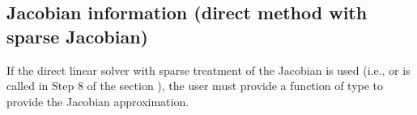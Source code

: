 \documentclass[letterpaper,10pt,english]{sphinxmanual}
\begin{document}
\subsection{Jacobian information (direct method with sparse Jacobian)}
\label{c_interface/User_supplied:cinterface-sparsejacobianfn}\label{c_interface/User_supplied:jacobian-information-direct-method-with-sparse-jacobian}
If the direct linear solver with sparse treatment of the Jacobian is
used (i.e., {\hyperref[c_interface/User_callable:c.ARKKLU]{\emph{}}} or {\hyperref[c_interface/User_callable:c.ARKSuperLUMT]{\emph{}}} is
called in Step 8 of the section {\hyperref[c_interface/Skeleton:cinterface-skeleton]{\emph{}}}), the user
must provide a function of type {\hyperref[c_interface/User_supplied:c.ARKSlsSparseJacFn]{\emph{}}} to provide
the Jacobian approximation.
\end{document}
